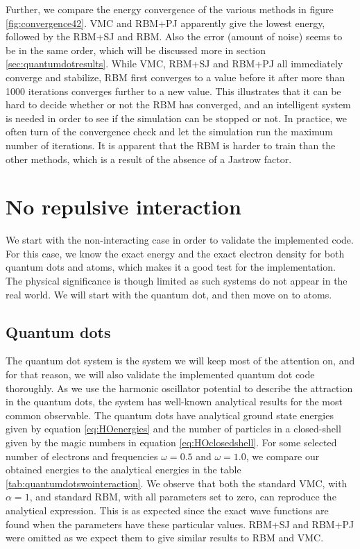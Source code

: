 Further, we compare the energy convergence of the various methods in figure \eqref{fig:convergence42}. VMC and RBM+PJ apparently give the lowest energy, followed by the RBM+SJ and RBM. Also the error (amount of noise) seems to be in the same order, which will be discussed more in section \ref{sec:quantumdotresults}. While VMC, RBM+SJ and RBM+PJ all immediately converge and stabilize, RBM first converges to a value before it after more than 1000 iterations converges further to a new value. This illustrates that it can be hard to decide whether or not the RBM has converged, and an intelligent system is needed in order to see if the simulation can be stopped or not. In practice, we often turn of the convergence check and let the simulation run the maximum number of iterations. It is apparent that the RBM is harder to train than the other methods, which is a result of the absence of a Jastrow factor.

\section{No repulsive interaction} \label{sec:norepulsive}
We start with the non-interacting case in order to validate the implemented code. For this case, we know the exact energy and the exact electron density for both quantum dots and atoms, which makes it a good test for the implementation. The physical significance is though limited as such systems do not appear in the real world. We will start with the quantum dot, and then move on to atoms. 

\subsection{Quantum dots}
The quantum dot system is the system we will keep most of the attention on, and for that reason, we will also validate the implemented quantum dot code thoroughly. As we use the harmonic oscillator potential to describe the attraction in the quantum dots, the system has well-known analytical results for the most common observable. The quantum dots have analytical ground state energies given by equation \eqref{eq:HOenergies} and the number of particles in a closed-shell given by the magic numbers in equation \eqref{eq:HOclosedshell}. For some selected number of electrons and frequencies $\omega=0.5$ and $\omega=1.0$, we compare our obtained energies to the analytical energies in the table \eqref{tab:quantumdotswointeraction}. We observe that both the standard VMC, with $\alpha=1$, and standard RBM, with all parameters set to zero, can reproduce the analytical expression. This is as expected since the exact wave functions are found when the parameters have these particular values. RBM+SJ and RBM+PJ were omitted as we expect them to give similar results to RBM and VMC.

